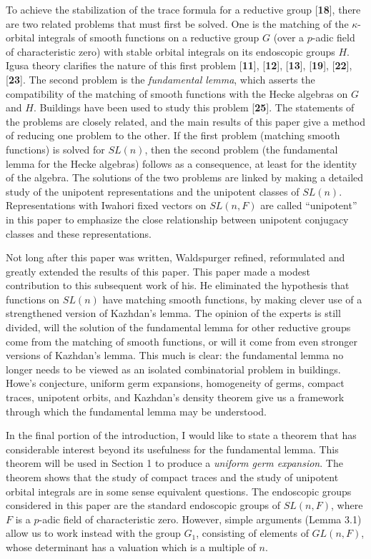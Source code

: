 \bigskip
\noindent
To achieve the stabilization of the trace formula for
  a reductive group [{\bf 18}], there are two related  
  problems that must first be solved.
One is the matching of the
    $ \kappa $-orbital 
  integrals of smooth functions on a reductive group $G$ (over a 
    $p$-adic field of characteristic zero)
  with stable orbital integrals on its endoscopic
  groups $H$.
  Igusa theory clarifies the nature of this first problem
  [{\bf 11}], [{\bf 12}], [{\bf 13}],  [{\bf 19}],
  [{\bf 22}], [{\bf 23}].
The second problem is the {\it fundamental lemma}, which 
  asserts the compatibility of the matching of smooth functions
  with the Hecke algebras on $G$ and $H$.  
  Buildings have been used to study this problem
  [{\bf 25}].
The statements of the problems are closely related,
and the main results of this paper give a method
of reducing one problem to the other.
 If the first problem (matching smooth functions)
  is solved for $SL(n)$, then the second problem (the fundamental lemma
  for the Hecke algebras) follows as a consequence,
  at least for the identity of the algebra.
The solutions of the two problems are linked by making
  a detailed study of the unipotent representations and 
  the unipotent classes of 
    $SL(n)$.
  Representations with Iwahori fixed vectors on
  $SL(n,F)$ are called ``unipotent'' in this paper to emphasize
  the close relationship between unipotent conjugacy classes and
  these representations.

Not long after this paper was written,
Waldspurger refined, reformulated and greatly extended the results of this paper. 
This paper made a modest contribution to this
subsequent work of his.
He eliminated the hypothesis that functions on $SL(n)$ have matching smooth
functions, by making clever use of a strengthened version of Kazhdan's lemma.
The opinion of the experts is still divided, will the solution of the fundamental
lemma for other reductive groups come from the matching of smooth functions, 
or will it come from even stronger
versions of Kazhdan's lemma.  This much is clear: the fundamental lemma
no longer needs to be viewed as an isolated combinatorial problem in buildings. 
Howe's conjecture, uniform germ expansions, homogeneity of germs, compact traces, unipotent orbits,
and Kazhdan's density theorem give us a framework through which the fundamental
lemma may be understood.  

In the final portion of the introduction, I would like to state a
theorem that has considerable interest beyond its usefulness for the
fundamental lemma.   This theorem will be used in Section 1 to produce
a {\it uniform germ expansion}.   The theorem shows that the study of compact traces
and the study of unipotent orbital integrals are in some sense
equivalent questions.
The endoscopic groups considered in this paper are the standard endoscopic groups
of $SL(n,F)$, where $F$ is a $p$-adic field of characteristic zero.  
However, simple arguments (Lemma 3.1) allow us to work instead with the group
$G_1$, consisting of elements of $GL(n,F)$, whose
determinant has a valuation which is a multiple of $n$.  

